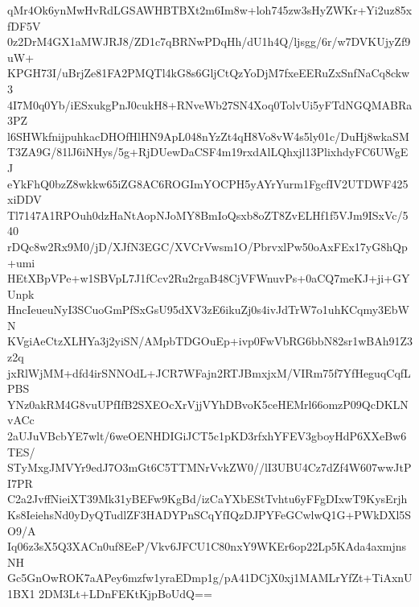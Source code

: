 qMr4Ok6ynMwHvRdLGSAWHBTBXt2m6Im8w+loh745zw3sHyZWKr+Yi2uz85xfDF5V
0z2DrM4GX1aMWJRJ8/ZD1c7qBRNwPDqHh/dU1h4Q/ljsgg/6r/w7DVKUjyZf9uW+
KPGH73I/uBrjZe81FA2PMQTl4kG8s6GljCtQzYoDjM7fxeEERuZxSnfNaCq8ckw3
4I7M0q0Yb/iESxukgPnJ0cukH8+RNveWb27SN4Xoq0TolvUi5yFTdNGQMABRa3PZ
l6SHWkfnijpuhkacDHOfHlHN9ApL048nYzZt4qH8Vo8vW4s5ly01c/DuHj8wkaSM
T3ZA9G/81lJ6iNHys/5g+RjDUewDaCSF4m19rxdAlLQhxjl13PlixhdyFC6UWgEJ
eYkFhQ0bzZ8wkkw65iZG8AC6ROGImYOCPH5yAYrYurm1FgcfIV2UTDWF425xiDDV
Tl7147A1RPOuh0dzHaNtAopNJoMY8BmIoQsxb8oZT8ZvELHf1f5VJm9ISxVc/540
rDQc8w2Rx9M0/jD/XJfN3EGC/XVCrVwsm1O/PbrvxlPw50oAxFEx17yG8hQp+umi
HEtXBpVPe+w1SBVpL7J1fCcv2Ru2rgaB48CjVFWnuvPs+0aCQ7meKJ+ji+GYUnpk
HncIeueuNyI3SCuoGmPfSxGsU95dXV3zE6ikuZj0s4ivJdTrW7o1uhKCqmy3EbWN
KVgiAeCtzXLHYa3j2yiSN/AMpbTDGOuEp+ivp0FwVbRG6bbN82sr1wBAh91Z3z2q
jxRlWjMM+dfd4irSNNOdL+JCR7WFajn2RTJBmxjxM/VIRm75f7YfHeguqCqfLPBS
YNz0akRM4G8vuUPfIfB2SXEOcXrVjjVYhDBvoK5ceHEMrl66omzP09QcDKLNvACc
2aUJuVBcbYE7wlt/6weOENHDIGiJCT5c1pKD3rfxhYFEV3gboyHdP6XXeBw6TES/
STyMxgJMVYr9edJ7O3mGt6C5TTMNrVvkZW0//lI3UBU4Cz7dZf4W607wwJtPI7PR
C2a2JvffNieiXT39Mk31yBEFw9KgBd/izCaYXbEStTvhtu6yFFgDIxwT9KysErjh
Ks8IeiehsNd0yDyQTudlZF3HADYPnSCqYfIQzDJPYFeGCwlwQ1G+PWkDXl5SO9/A
Iq06z3sX5Q3XACn0uf8EeP/Vkv6JFCU1C80nxY9WKEr6op22Lp5KAda4axmjnsNH
Gc5GnOwROK7aAPey6mzfw1yraEDmp1g/pA41DCjX0xj1MAMLrYfZt+TiAxnU1BX1
2DM3Lt+LDnFEKtKjpBoUdQ==
